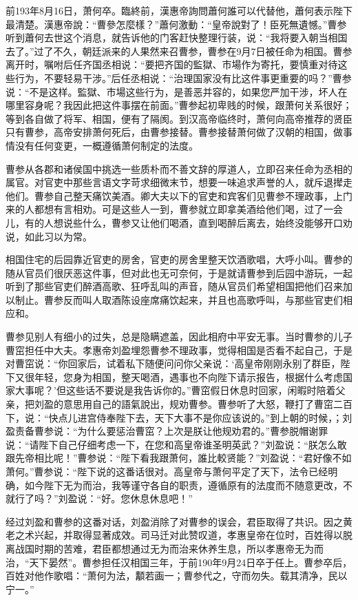 前193年8月16日，萧何卒。臨終前，漢惠帝詢問蕭何誰可以代替他，蕭何表示陛下最清楚。漢惠帝說：“曹參怎麼樣？”蕭何激動：“皇帝說對了！臣死無遺憾。”曹参听到蕭何去世这个消息，就告诉他的门客赶快整理行装，说：“我将要入朝当相国去了。”过了不久，朝廷派来的人果然来召曹参，曹参在9月7日被任命为相国。曹参离开时，嘱咐后任齐国丞相说：“要把齐国的監獄、市場作为寄托，要慎重对待这些行为，不要轻易干涉。”后任丞相说：“治理国家没有比这件事更重要的吗？”曹参说：“不是这样。監獄、市場这些行为，是善恶并容的，如果您严加干涉，坏人在哪里容身呢？我因此把这件事摆在前面。”曹参起初卑贱的时候，跟萧何关系很好；等到各自做了将军、相国，便有了隔阂。到汉高帝临终时，萧何向高帝推荐的贤臣只有曹参，高帝安排萧何死后，由曹参接替。曹参接替萧何做了汉朝的相国，做事情没有任何变更，一概遵循萧何制定的法度。

曹参从各郡和诸侯国中挑选一些质朴而不善文辞的厚道人，立即召来任命为丞相的属官。对官吏中那些言语文字苛求细微末节，想要一味追求声誉的人，就斥退撵走他们。曹参自己整天痛饮美酒。卿大夫以下的官吏和宾客们见曹参不理政事，上门来的人都想有言相劝。可是这些人一到，曹参就立即拿美酒给他们喝，过了一会儿，有的人想说些什么，曹参又让他们喝酒，直到喝醉后离去，始终没能够开口劝说，如此习以为常。

相国住宅的后园靠近官吏的房舍，官吏的房舍里整天饮酒歌唱，大呼小叫。曹参的随从官员们很厌恶这件事，但对此也无可奈何，于是就请曹参到后园中游玩，一起听到了那些官吏们醉酒高歌、狂呼乱叫的声音，随从官员们希望相国把他们召来加以制止。曹参反而叫人取酒陈设座席痛饮起来，并且也高歌呼叫，与那些官吏们相应和。

曹参见别人有细小的过失，总是隐瞒遮盖，因此相府中平安无事。当时曹参的儿子曹窋担任中大夫。孝惠帝刘盈埋怨曹参不理政事，觉得相国是否看不起自己，于是对曹窋说：“你回家后，试着私下随便问问你父亲说：‘高皇帝刚刚永别了群臣，陛下又很年轻，您身为相国，整天喝酒，遇事也不向陛下请示报告，根据什么考虑国家大事呢？’但这些话不要说是我告诉你的。”曹窋假日休息时回家，闲暇时陪着父亲，把刘盈的意思用自己的語氣說出，规劝曹参。曹参听了大怒，鞭打了曹窋二百下，说：“快点儿进宫侍奉陛下去，天下大事不是你应该说的。”到上朝的时候，；刘盈责备曹参说：“为什么要惩治曹窋？上次是朕让他规劝君的。”曹参脱帽谢罪说：“请陛下自己仔细考虑一下，在您和高皇帝谁圣明英武？”刘盈说：“朕怎么敢跟先帝相比呢！”曹参说：“陛下看我跟萧何，誰比較贤能？”刘盈说：“君好像不如萧何。”曹参说：“陛下说的这番话很对。高皇帝与萧何平定了天下，法令已经明确，如今陛下无为而治，我等谨守各自的职责，遵循原有的法度而不随意更改，不就行了吗？”刘盈说：“好。您休息休息吧！”

经过刘盈和曹参的这番对话，刘盈消除了对曹参的误会，君臣取得了共识。因之黄老之术兴起，并取得显著成效。司马迁对此赞叹道，孝惠皇帝在位时，百姓得以脱离战国时期的苦难，君臣都想通过无为而治来休养生息，所以孝惠帝无为而治，“天下晏然”。曹参担任汉相国三年，于前190年9月24日卒于任上。曹参卒后，百姓对他作歌唱：“萧何为法，顜若画一；曹参代之，守而勿失。载其清净，民以宁一。”

